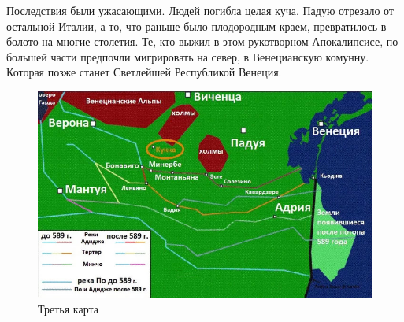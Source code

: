 Последствия были ужасающими. Людей погибла целая куча, Падую отрезало от остальной Италии, а то, что раньше было плодородным краем, превратилось в болото на многие столетия. Те, кто выжил в этом рукотворном Апокалипсисе, по большей части предпочли мигрировать на север, в Венецианскую комунну. Которая позже станет Светлейшей Республикой Венеция. 
\begin{figure}[h!tb]
	\centering\includegraphics[scale=0.5]{Data/antic_technocrash/1614663830115017356.jpg}
	\caption{Третья карта
	}
	\label{fig:tech3} %
\end{figure}


